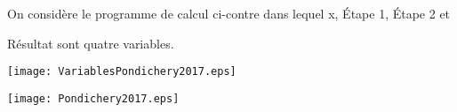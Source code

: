 
\medskip 

\parbox{0.43\linewidth}{On considère le programme de calcul ci-contre dans lequel x, Étape 1,
Étape 2 et 

Résultat sont quatre variables.}\hfill
\parbox{0.53\linewidth}{{
\texttt{[image: VariablesPondichery2017.eps]}


\texttt{[image: Pondichery2017.eps]}
}}

\medskip

